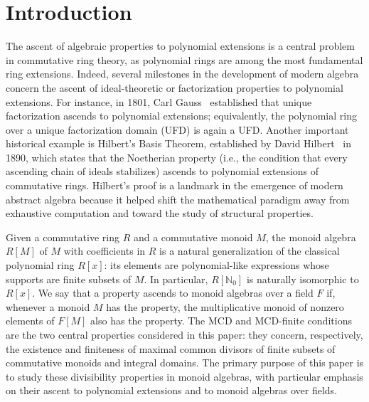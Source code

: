 \documentclass[10pt]{amsart}
\theoremstyle{definition}
\theoremstyle{remark}
\numberwithin{equation}{section}
\newcommand{\nn}{\mathbb{N}}
\begin{document}
\bigskip
\maketitle







\bigskip
\section{Introduction}
\label{sec:intro}

The ascent of algebraic properties to polynomial extensions is a central problem in commutative ring theory, as polynomial rings are among the most fundamental ring extensions. Indeed, several milestones in the development of modern algebra concern the ascent of ideal-theoretic or factorization properties to polynomial extensions. For instance, in 1801, Carl Gauss~\cite{cG1801} established that unique factorization ascends to polynomial extensions; equivalently, the polynomial ring over a unique factorization domain (UFD) is again a UFD. Another important historical example is Hilbert's Basis Theorem, established by David Hilbert~\cite{dH1890} in 1890, which states that the Noetherian property (i.e., the condition that every ascending chain of ideals stabilizes) ascends to polynomial extensions of commutative rings. Hilbert's proof is a landmark in the emergence of modern abstract algebra because it helped shift the mathematical paradigm away from exhaustive computation and toward the study of structural properties.
\smallskip

Given a commutative ring $R$ and a commutative monoid $M$, the monoid algebra $R[M]$ of $M$ with coefficients in $R$ is a natural generalization of the classical polynomial ring $R[x]$: its elements are polynomial-like expressions whose supports are finite subsets of $M$. In particular, $R[\nn_0]$ is naturally isomorphic to $R[x]$. We say that a property ascends to monoid algebras over a field $F$ if, whenever a monoid $M$ has the property, the multiplicative monoid of nonzero elements of $F[M]$ also has the property. The MCD and MCD-finite conditions are the two central properties considered in this paper: they concern, respectively, the existence and finiteness of maximal common divisors of finite subsets of commutative monoids and integral domains. The primary purpose of this paper is to study these divisibility properties in monoid algebras, with particular emphasis on their ascent to polynomial extensions and to monoid algebras over fields.
\smallskip
\end{document}
